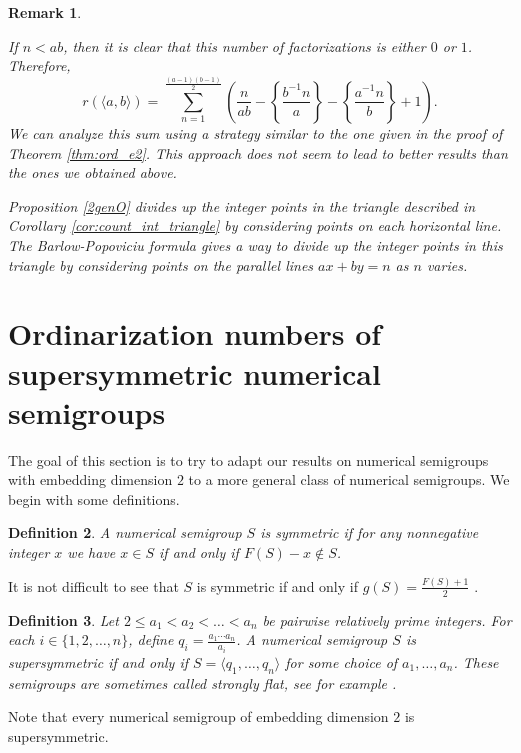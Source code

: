 \documentclass[12pt]{amsart}
\theoremstyle{plain}\newtheorem{proposition}{Proposition}[section]
\newtheorem{defn}[proposition]{Definition}
\newtheorem{remark}[proposition]{Remark}
\begin{document}
\begin{remark}
\begin{enumerate}[leftmargin=*]
If $n < ab$, then it is clear that this number of factorizations is either $0$ or $1$.  Therefore, 
\[
r(\langle a,b \rangle) = \sum_{n=1}^{\frac{(a-1)(b-1)}{2}} \left(\frac{n}{ab} - \left\{\frac{b^{-1} n}{a} \right\} - \left\{\frac{a^{-1} n}{b} \right\} + 1\right).
\]
We can analyze this sum using a strategy similar to the one given in the proof of Theorem \ref{thm:ord_e2}.  This approach does not seem to lead to better results than the ones we obtained above.

Proposition \ref{2genO} divides up the integer points in the triangle described in Corollary \ref{cor:count_int_triangle} by considering points on each horizontal line.  The Barlow-Popoviciu formula gives a way to divide up the integer points in this triangle by considering points on the parallel lines $ax+by = n$ as $n$ varies.
\end{enumerate}

\end{remark}

\section{Ordinarization numbers of supersymmetric numerical semigroups}\label{sec:ord_super}

The goal of this section is to try to adapt our results on numerical semigroups with embedding dimension $2$ to a more general class of numerical semigroups.  We begin with some definitions.
\begin{defn}
A numerical semigroup $S$ is \emph{symmetric} if for any nonnegative integer $x$ we have $x \in S$ if and only if $F(S) - x \not\in S$.  
\end{defn}
\noindent It is not difficult to see that $S$ is symmetric if and only if  $g(S) = \frac{F(S)+1}{2}$ \cite[Corollary 4.5]{GarciaSanchez_Rosales}.

\begin{defn}
Let $2\le a_1 < a_2 < \ldots < a_n$ be pairwise relatively prime integers. For each $i \in \{1,2,\ldots, n\}$, define $q_i = \frac{a_1 \cdots a_n}{a_i}$.  A numerical semigroup $S$ is \emph{supersymmetric} if and only if $S = \langle q_1,\ldots, q_n\rangle$ for some choice of $a_1,\ldots, a_n$.  These semigroups are sometimes called \emph{strongly flat}, see for example \cite{StronglyFlat}.  
\end{defn}
\noindent Note that every numerical semigroup of embedding dimension $2$ is supersymmetric.
\end{document}
